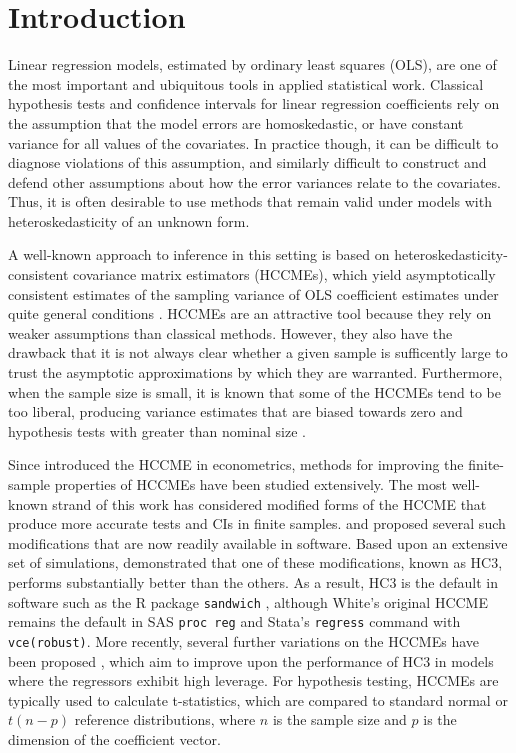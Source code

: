 \documentclass[12pt]{article}\usepackage[]{graphicx}\usepackage[]{color}
\begin{document}
\newpage
{} %

\section{Introduction}
\label{sec:intro}

Linear regression models, estimated by ordinary least squares (OLS), are one of the most important and ubiquitous tools in applied statistical work.
Classical hypothesis tests and confidence intervals for linear regression coefficients rely on the assumption that the model errors are homoskedastic, or have constant variance for all values of the covariates. 
In practice though, it can be difficult to diagnose violations of this assumption, and similarly difficult to construct and defend other assumptions about how the error variances relate to the covariates. 
Thus, it is often desirable to use methods that remain valid under models with heteroskedasticity of an unknown form.

A well-known approach to inference in this setting is based on heteroskedasticity-consistent covariance matrix estimators (HCCMEs), which yield asymptotically consistent estimates of the sampling variance of OLS coefficient estimates under quite general conditions \citep{Huber1967behavior, Eicker1967limit, White1980heteroskedasticity}. 
HCCMEs are an attractive tool because they rely on weaker assumptions than classical methods. 
However, they also have the drawback that it is not always clear whether a given sample is sufficently large to trust the asymptotic approximations by which they are warranted. 
Furthermore, when the sample size is small, it is known that some of the HCCMEs tend to be too liberal, producing variance estimates that are biased towards zero and hypothesis tests with greater than nominal size \citep{Long2000using}. 

Since \citet{White1980heteroskedasticity} introduced the HCCME in econometrics, methods for improving the finite-sample properties of HCCMEs have been studied extensively.  
The most well-known strand of this work has considered modified forms of the HCCME that produce more accurate tests and CIs in finite samples. \citet{MacKinnon1985some} and \citet{Davidson1993estimation} proposed several such modifications that are now readily available in software. 
Based upon an extensive set of simulations, \citet{Long2000using} demonstrated that one of these modifications, known as HC3, performs substantially better than the others.
As a result, HC3 is the default in software such as the R package \texttt{sandwich} \citep{Zeileis2004econometric}, although White's original HCCME remains the default in SAS \texttt{proc reg} and Stata's \texttt{regress} command with \texttt{vce(robust)}. 
More recently, several further variations on the HCCMEs have been proposed \citep{Cribari-Neto2004asymptotic, Cribari-Neto2007inference, Cribari-Neto2011new}, which aim to improve upon the performance of HC3 in models where the regressors exhibit high leverage. 
For hypothesis testing, HCCMEs are typically used to calculate t-statistics, which are compared to standard normal or $t(n - p)$ reference distributions, where $n$ is the sample size and $p$ is the dimension of the coefficient vector.
\end{document}
